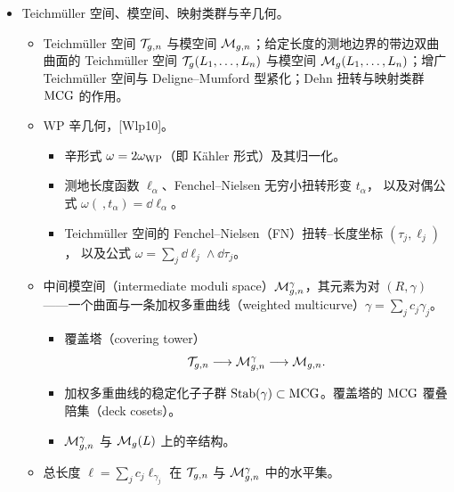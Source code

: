 \begin{itemize}[leftmargin=1.6em,itemsep=2pt,topsep=2pt]
\item Teichmüller 空间、模空间、映射类群与辛几何。
  \begin{itemize}[leftmargin=1.6em,itemsep=2pt,topsep=2pt]
  \item Teichmüller 空间 $\mathcal{T}_{g,n}$ 与模空间 $\mathcal{M}_{g,n}$；给定长度的测地边界的带边双曲曲面的
    Teichmüller 空间 $\mathcal{T}_g(L_1,\ldots,L_n)$ 与模空间 $\mathcal{M}_g(L_1,\ldots,L_n)$；增广
    Teichmüller 空间与 Deligne--Mumford 型紧化；Dehn 扭转与映射类群 $\mathrm{MCG}$ 的作用。
  \item WP 辛几何，[Wlp10]。
    \begin{itemize}[leftmargin=1.6em,itemsep=2pt,topsep=2pt]
    \item 辛形式 $\omega=2\omega_{\mathrm{WP}}$（即 Kähler 形式）及其归一化。
    \item 测地长度函数 $\ell_\alpha$、Fenchel--Nielsen 无穷小扭转形变 $t_\alpha$，
      以及对偶公式 $\omega(\ ,t_\alpha)=\dd\ell_\alpha$。
    \item Teichmüller 空间的 Fenchel--Nielsen（FN）扭转--长度坐标 $(\tau_j,\ell_j)$，
      以及公式 $\omega=\sum_j\dd\ell_j\wedge\dd\tau_j$。
    \end{itemize}
  \item 中间模空间（intermediate moduli space）$\mathcal{M}_{g,n}^\gamma$，其元素为对 $(R,\gamma)$
    ——一个曲面与一条加权多重曲线（weighted multicurve）$\gamma=\sum_j c_j\gamma_j$。
    \begin{itemize}[leftmargin=1.6em,itemsep=2pt,topsep=2pt]
    \item 覆盖塔（covering tower）
      \[
      \mathcal{T}_{g,n}\longrightarrow\mathcal{M}_{g,n}^\gamma\longrightarrow\mathcal{M}_{g,n}.
      \]
    \item 加权多重曲线的稳定化子子群 $\mathrm{Stab}(\gamma)\subset\mathrm{MCG}$。覆盖塔的 $\mathrm{MCG}$
      覆叠陪集（deck cosets）。


    \item $\mathcal{M}_{g,n}^\gamma$ 与 $\mathcal{M}_g(L)$ 上的辛结构。
    \end{itemize}
  \item 总长度 $\ell=\sum_j c_j\ell_{\gamma_j}$ 在 $\mathcal{T}_{g,n}$ 与 $\mathcal{M}_{g,n}^\gamma$ 中的水平集。


\end{itemize}
\end{itemize}
